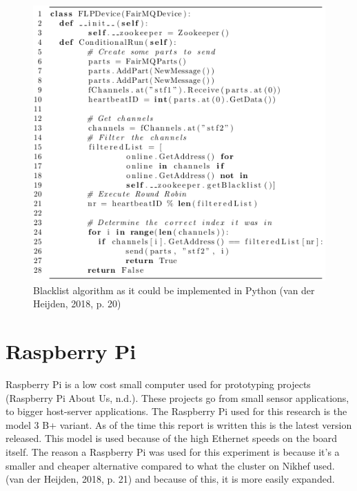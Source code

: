 \begin{figure}[htb]
	\centering
	\includegraphics[scale=0.6]{./graphics/BlacklistAlgorithm.png}
	\caption{Blacklist algorithm as it could be implemented in Python (van der Heijden, 2018, p. 20)}
	\label{fig:BlacklistAlgorithm}
\end{figure}


\section{Raspberry Pi}
Raspberry Pi is a  low cost small computer used for prototyping projects (Raspberry Pi About Us, n.d.). These projects go from small sensor applications, to bigger host-server applications. The Raspberry Pi used for this research is the model 3 B+ variant. As of the time this report is written this is the latest version released. This model is used because of the high Ethernet speeds on the board itself. The reason a Raspberry Pi was used for this experiment is because it's a smaller and cheaper alternative compared to what the cluster on Nikhef used. (van der Heijden, 2018, p. 21) and because of this, it is more easily expanded.